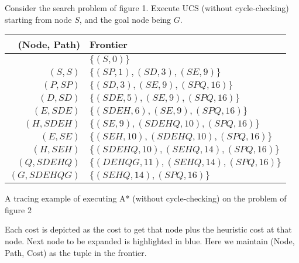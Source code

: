 \begin{listo}
    \item Consider the search problem of figure 1. Execute UCS (without cycle-checking) starting from node $S$, and the goal node being $G$.


    \begin{table}[ht!]
        \centering

        \begin{tabular}{r | l}
            (Node, Path)  & Frontier                                   \\ \hline
                          & $\{ (S, 0) \}$                             \\
            $(S, S)$      & $\{ (SP, 1), (SD, 3), (SE, 9) \}$          \\
            $(P, SP)$     & $\{ (SD, 3), (SE, 9), (SPQ, 16) \}$        \\
            $(D, SD)$     & $\{ (SDE, 5), (SE, 9), (SPQ, 16) \}$       \\
            $(E, SDE)$    & $\{ (SDEH, 6), (SE, 9), (SPQ, 16) \}$      \\
            $(H, SDEH)$   & $\{ (SE, 9), (SDEHQ, 10), (SPQ, 16) \}$    \\
            $(E, SE)$     & $\{ (SEH, 10), (SDEHQ, 10), (SPQ, 16) \}$  \\
            $(H, SEH)$    & $\{ (SDEHQ, 10), (SEHQ, 14), (SPQ, 16) \}$ \\
            $(Q, SDEHQ)$  & $\{ (DEHQG, 11), (SEHQ, 14), (SPQ, 16) \}$ \\
            $(G, SDEHQG)$ & $\{ (SEHQ, 14), (SPQ, 16) \}$              \\
        \end{tabular}
    \end{table}

    \item A tracing example of executing A* (without cycle-checking) on the problem of figure 2
    

    Each cost is depicted as the cost to get that node plus the heuristic cost at that node. Next node to be expanded is highlighted in blue. Here we maintain (Node, Path, Cost) as the tuple in the frontier.

    \begin{table}[ht!]
        \centering


\end{table}
\end{listo}
